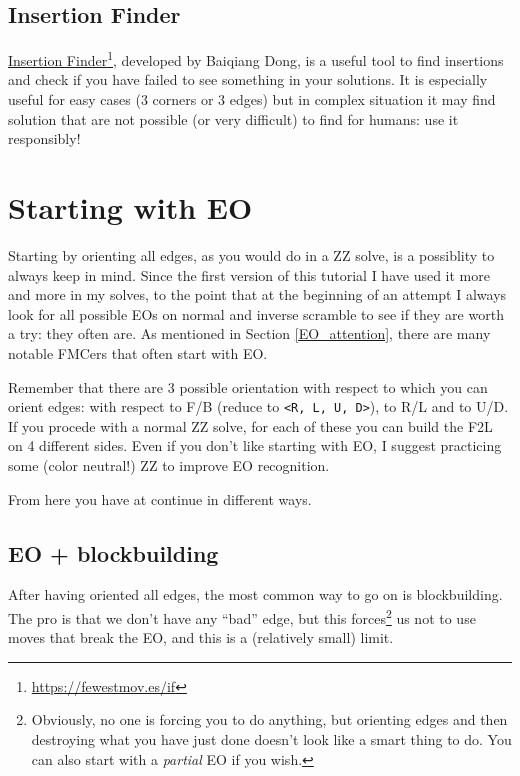 \documentclass[11pt,a4paper]{book}
\newcommand{\m}{\texttt}
\begin{document}
\subsection{Insertion Finder}

\href{https://fewestmov.es/if}{Insertion Finder}\footnote{\url{https://fewestmov.es/if}}, developed by Baiqiang Dong, is a useful tool to find insertions and check if you have failed to see something in your solutions. %
It is especially useful for easy cases (3 corners or 3 edges) but in complex situation it may find solution that are not possible (or very difficult) to find for humans: use it responsibly!

\section{Starting with EO}
\label{eo}

Starting by orienting all edges, as you would do in a ZZ solve, is a possiblity to always keep in mind. Since the first version of this tutorial I have used it more and more in my solves, to the point that at the beginning of an attempt I always look for all possible EOs on normal and inverse scramble to see if they are worth a try: they often are. As mentioned in Section \ref{EO_attention}, there are many notable FMCers that often start with EO.

Remember that there are 3 possible orientation with respect to which you can orient edges: with respect to F/B (reduce to \m{<R, L, U, D>}), to R/L and to U/D. If you procede with a normal ZZ solve, for each of these you can build the F2L on 4 different sides. Even if you don't like starting with EO, I suggest practicing some (color neutral!) ZZ to improve EO recognition.

From here you have at continue in different ways.

\subsection{EO + blockbuilding} 

After having oriented all edges, the most common way to go on is blockbuilding. The pro is that we don't have any ``bad'' edge, but this forces\footnote{Obviously, no one is forcing you to do anything, but orienting edges and then destroying what you have just done doesn't look like a smart thing to do. You can also start with a \emph{partial} EO if you wish.} us not to use moves that break the EO, and this is a (relatively small) limit.
\end{document}
